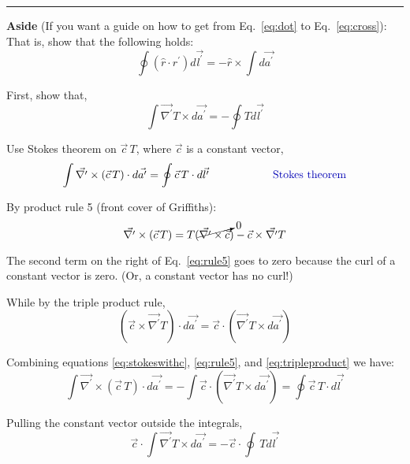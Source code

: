 \documentclass[12pt]{article}
\begin{document}
\begin{flushleft}
\vspace{.4in}
{\color{grey} \rule{\linewidth}{0.7mm} }
{\color{myblue} \bf Aside} (If you want a guide on how to get from Eq.~\ref{eq:dot} to Eq.~\ref{eq:cross}):\\
\vspace{\baselineskip}
That is, show that the following holds:
\[
\oint ( \hat{r} \cdot r^{\prime} ) d\vec{l^{\prime}} = - \hat{r} \times \int d\vec{a^{\prime}}
\]

First, show that,
\[
\int \vec{\nabla^{\prime}}T \times d\vec{a^{\prime}} = - \oint T d\vec{l^{\prime}}
\]

Use Stokes theorem on $\vec{c}\,T$, where $\vec{c}$ is a constant vector,
\begin{equation}
\int \vec{\nabla^{\prime}} \times (\vec{c}\,T) \cdot d\vec{a^{\prime}} = \oint \vec{c}\,T \cdot d\vec{l^{\prime}} \hspace{.8in} \text{\color{myblue} Stokes theorem}
\label{eq:stokeswithc}
\end{equation}

By product rule 5 (front cover of Griffiths):
\begin{equation}
\vec{\nabla^{\prime}} \times (\vec{c}\,T) = T (\cancelto{0}{\vec{\nabla^{\prime}} \times \vec{c}} ) - \vec{c} \times \vec{\nabla^{\prime}} T
\label{eq:rule5}
\end{equation}

The second term on the right of Eq.~\ref{eq:rule5} goes to zero because the curl of a constant vector is zero.  (Or, a constant vector has no curl!)

While by the triple product rule,
\begin{equation}
( \vec{c} \times \vec{\nabla^{\prime}} T ) \cdot d\vec{a^{\prime}} = \vec{c} \cdot ( \vec{\nabla^{\prime}} T \times  d\vec{a^{\prime}} )
\label{eq:tripleproduct}
\end{equation}

Combining equations \ref{eq:stokeswithc}, \ref{eq:rule5}, and \ref{eq:tripleproduct} we have:
\[
\int \vec{\nabla^{\prime}} \times (\vec{c}\,T) \cdot d\vec{a^{\prime}} = -\int \vec{c} \cdot ( \vec{\nabla^{\prime}} T \times  d\vec{a^{\prime}} ) = \oint \vec{c}\,T \cdot d\vec{l^{\prime}}
\]

Pulling the constant vector outside the integrals,
\[
 \vec{c} \cdot \int \vec{\nabla^{\prime}} T \times  d\vec{a^{\prime}}  = - \vec{c} \cdot \oint \,T  d\vec{l^{\prime}}
\]


\end{flushleft}
\end{document}
